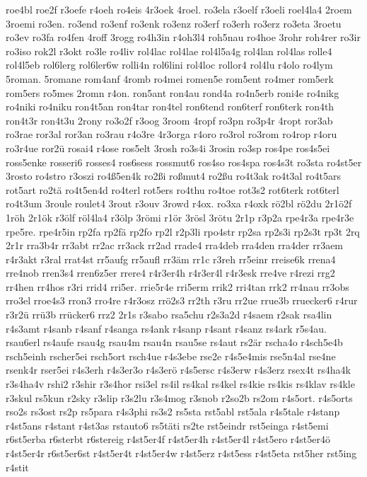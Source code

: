 {roe4bl
roe2f
r3oefe
r4oeh
ro4eis
4r3oek
4roel.
ro3ela
r3oelf
r3oeli
roel4la4
2roem
3roemi
ro3en.
ro3end
ro3enf
ro3enk
ro3enz
ro3erf
ro3erh
ro3erz
ro3eta
3roetu
ro3ev
ro3fa
ro4fen
4roff
3rogg
ro4h3in
r4oh3l4
roh5nau
ro4hoe
3rohr
roh4rer
ro3ir
ro3iso
rok2l
r3okt
ro3le
ro4liv
rol4lac
rol4lae
rol4l5a4g
rol4lan
rol4las
rolle4
rol4l5eb
rol6lerg
rol6ler6w
rolli4n
rol6lini
rol4loc
rollor4
rol4lu
r4olo
ro4lym
5roman.
5romane
rom4anf
4romb
ro4mei
romen5e
rom5ent
ro4mer
rom5erk
rom5ers
ro5mes
2romn
r4on.
ron5ant
ron4au
rond4a
ro4n5erb
roni4e
ro4nikg
ro4niki
ro4niku
ron4t5an
ron4tar
ron4tel
ron6tend
ron6terf
ron6terk
ron4th
ron4t3r
ron4t3u
2rony
ro3o2f
r3oog
3room
4ropf
ro3pn
ro3p4r
4ropt
ror3ab
ro3rae
ror3al
ror3an
ro3rau
r4o3re
4r3orga
r4oro
ro3rol
ro3rom
ro4rop
r4oru
ro3r4ue
ror2ü
rosai4
r4ose
ros5elt
3rosh
ro3s4i
3rosin
ro3sp
ros4pe
ros4s5ei
ross5enke
rosseri6
rosses4
ros6sess
rossmut6
ros4so
ros4spa
ros4s3t
ro3sta
ro4st5er
3rosto
ro4stro
r3oszi
ro4ß5en4k
ro2ßi
roßmut4
ro2ßu
ro4t3ak
ro4t3al
ro4t5ars
rot5art
ro2tä
ro4t5en4d
ro4terl
rot5ers
ro4thu
ro4toe
rot3s2
rot6terk
rot6terl
ro4t3um
3roule
roulet4
3rout
r3ouv
3rowd
r4ox.
ro3xa
r4oxk
rö2bl
rö2du
2r1ö2f
1röh
2r1ök
r3ölf
röl4la4
r3ölp
3römi
r1ör
3rösl
3rötu
2r1p
r3p2a
rpe4r3a
rpe4r3e
rpe5re.
rpe4r5in
rp2fa
rp2fä
rp2fo
rp2l
r2p3li
rpo4str
rp2sa
rp2s3i
rp2s3t
rp3t
2rq
2r1r
rra3b4r
rr3abt
rr2ac
rr3ack
rr2ad
rrade4
rra4deb
rra4den
rra4der
rr3aem
r4r3akt
r3ral
rrat4st
rr5aufg
rr5aufl
rr3äm
rr1c
r3reh
rr5einr
rreise6k
rrena4
rre4nob
rren3s4
rren6z5er
rrere4
r4r3er4h
r4r3er4l
r4r3esk
rre4ve
r4rezi
rrg2
rr4hen
rr4hos
r3ri
rrid4
rri5er.
rrie5r4e
rri5erm
rrik2
rri4tan
rrk2
rr4nau
rr3obs
rro3el
rroe4s3
rron3
rro4re
r4r3osz
rrö2s3
rr2th
r3ru
rr2ue
rrue3b
rruecker6
r4rur
r3r2ü
rrü3b
rrücker6
rrz2
2r1s
r3sabo
rsa5chu
r2s3a2d
r4saem
r2sak
rsa4lin
r4s3amt
r4sanb
r4sanf
r4sanga
rs4ank
r4sanp
r4sant
r4sanz
rs4ark
r5s4au.
rsau6erl
rs4aufe
rsau4g
rsau4m
rsau4n
rsau5se
rs4aut
rs2är
rscha4o
r4sch5e4b
rsch5einh
rscher5ei
rsch5ort
rsch4ue
r4s3ebe
rse2e
r4s5e4mis
rse5n4al
rse4ne
rsenk4r
rser5ei
r4s3erh
r4s3er3o
r4s3erö
r4s5ersc
r4s3erw
r4s3erz
rsex4t
rs4ha4k
r3s4ha4v
rshi2
r3shir
r3s4hor
rsi3el
rs4il
rs4kal
rs4kel
rs4kie
rs4kis
rs4klav
rs4kle
r3skul
rs5kun
r2sky
r3slip
r3s2lu
r3s4mog
r3snob
r2so2b
rs2om
r4s5ort.
r4s5orts
rso2s
rs3ost
rs2p
rs5para
r4s3phi
rs3s2
rs5sta
rst5abl
rst5ala
r4s5tale
r4stanp
r4st5ans
r4stant
r4st3as
rstauto6
rs5täti
rs2te
rst5eindr
rst5einga
r4st5emi
r6st5erba
r6sterbt
r6stereig
r4st5er4f
r4st5er4h
r4st5er4l
r4st5ero
r4st5er4ö
r4st5er4r
r6st5er6st
r4st5er4t
r4st5er4w
r4st5erz
r4st5ess
r4st5eta
rst5her
rst5ing
r4stit
}
